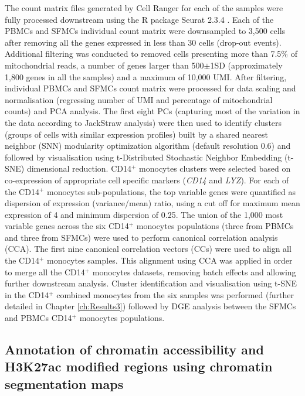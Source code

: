 The count matrix files generated by Cell Ranger for each of the samples were fully processed downstream using the R package Seurat 2.3.4 \parencite{Butler2018}. Each of the PBMCs and SFMCs individual count matrix were downsampled to 3,500 cells after removing all the genes expressed in less than 30 cells (drop-out events). Additional filtering was conducted to removed cells presenting more than 7.5\% of mitochondrial reads, a number of genes larger than 500$\pm$1SD (approximately 1,800 genes in all the samples) and a maximum of 10,000 UMI. After filtering, individual PBMCs and SFMCs count matrix were processed for data scaling and normalisation (regressing number of UMI and percentage of mitochondrial counts) and PCA analysis. The first eight PCs (capturing most of the variation in the data according to JackStraw analysis) were then used to identify clusters (groups of cells with similar expression profiles) built by a shared nearest neighbor (SNN) modularity optimization algorithm (default resolution 0.6) and followed by visualisation using t-Distributed Stochastic Neighbor Embedding (t-SNE) dimensional reduction. CD14$^+$ monocytes clusters were selected based on co-expression of appropriate cell specific markers (\textit{CD14} and \textit{LYZ}). For each of the CD14$^+$ monocytes sub-populations, the top variable genes were quantified as dispersion of expression (variance/mean) ratio, using a cut off for maximum mean expression of 4 and minimum dispersion of 0.25. The union of the 1,000 most variable genes across the six CD14$^+$ monocytes populations (three from PBMCs and three from SFMCs) were used to perform canonical correlation analysis (CCA). The first nine canonical correlation vectors (CCs) were used to align all the CD14$^+$ monocytes samples. This alignment using CCA was applied in order to merge all the CD14$^+$ monocytes datasets, removing batch effects and allowing further downstream analysis. Cluster identification and visualisation using t-SNE in the CD14$^+$ combined monocytes from the six samples was performed (further detailed in Chapter \ref{ch:Results3}) followed by DGE analysis between the SFMCs and PBMCs CD14$^+$ monocytes populations. 

 

\subsection{Annotation of chromatin accessibility and H3K27ac modified regions using chromatin segmentation maps}



